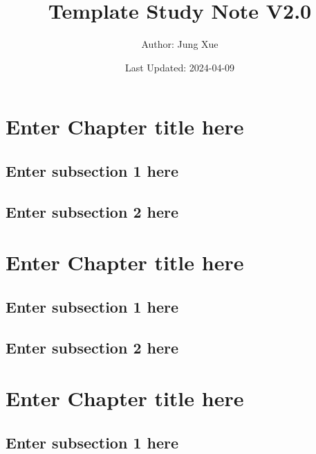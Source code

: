 \documentclass[
]{book}
\title{Template Study Note V2.0}
\author{Author: Jung Xue}
\date{Last Updated: 2024-04-09}
\begin{document}
\maketitle

{
\setcounter{tocdepth}{1}
\tableofcontents
}
\hypertarget{ch1}{%
\chapter{Enter Chapter title here}\label{ch1}}

\hypertarget{enter-subsection-1-here}{%
\section{Enter subsection 1 here}\label{enter-subsection-1-here}}

\hypertarget{enter-subsection-2-here}{%
\section{Enter subsection 2 here}\label{enter-subsection-2-here}}

\hypertarget{ch2}{%
\chapter{Enter Chapter title here}\label{ch2}}

\hypertarget{enter-subsection-1-here-1}{%
\section{Enter subsection 1 here}\label{enter-subsection-1-here-1}}

\hypertarget{enter-subsection-2-here-1}{%
\section{Enter subsection 2 here}\label{enter-subsection-2-here-1}}

\hypertarget{ch3}{%
\chapter{Enter Chapter title here}\label{ch3}}

\hypertarget{enter-subsection-1-here-2}{%
\section{Enter subsection 1 here}\label{enter-subsection-1-here-2}}
\end{document}
